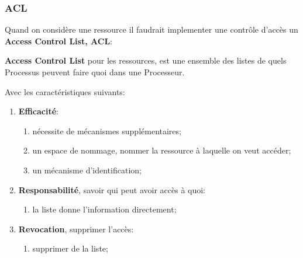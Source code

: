 \documentclass{article}
\begin{document}
\subsubsection*{ACL}
Quand on considère une ressource il faudrait implementer une contrôle d'accès un \textbf{Access Control List, ACL}:
\begin{definition}
    \textbf{Access Control List} pour les ressources, est une ensemble des listes de quels Processus peuvent faire quoi dans une Processeur.
\end{definition}
Avec les caractéristiques suivants:
\begin{enumerate}
    \item \textbf{Efficacité}:
    \begin{enumerate}[noitemsep]
        \item nécessite de mécanismes supplémentaires;
        \item un espace de nommage, nommer la ressource à laquelle on veut accéder;
        \item un mécanisme d'identification;
    \end{enumerate}

    \item \textbf{Responsabilité}, savoir qui peut avoir accès à quoi:
    \begin{enumerate}[noitemsep]
        \item la liste donne l'information directement;
    \end{enumerate}

    \item \textbf{Revocation}, supprimer l'accès:
    \begin{enumerate}[noitemsep]
        \item supprimer de la liste;
    \end{enumerate}
\end{enumerate}
\end{document}
